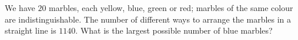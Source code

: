 We have $20$ marbles, each yellow, blue, green or red; marbles of the same colour are indistinguishable. The number of different ways to arrange the marbles in a straight line is $1140$. What is the largest possible number of blue marbles?
